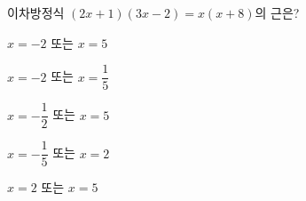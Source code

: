 이차방정식 $(2x+1)(3x-2)=x(x+8)$의 근은?
\begin{choicesii}{\rule[-3ex]{0pt}{8ex}$x=-2$ 또는 $x=5$}{\rule[-3ex]{0pt}{8ex}$x=-2$ 또는 $x=\dfrac{1}{5}$}{\rule[-3ex]{0pt}{8ex}$x=-\dfrac{1}{2}$ 또는 $x=5$}{\rule[-3ex]{0pt}{8ex}$x=-\dfrac{1}{5}$ 또는 $x=2$}{\rule[-3ex]{0pt}{8ex}$x=2$ 또는 $x=5$}\end{choicesii}
